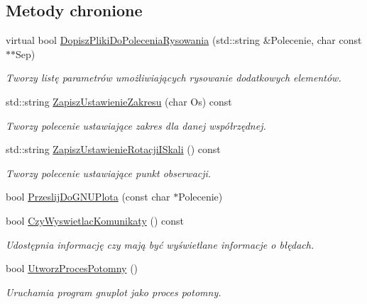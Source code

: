\subsection*{Metody chronione}
\begin{DoxyCompactItemize}
\item 
virtual bool \hyperlink{class_pz_g_1_1_lacze_do_g_n_u_plota_a25585ec3f1bd3b6bf42f374c38b8d237}{Dopisz\+Pliki\+Do\+Polecenia\+Rysowania} (std\+::string \&Polecenie, char const $\ast$$\ast$Sep)
\begin{DoxyCompactList}\small\item\em Tworzy listę parametrów umożliwiających rysowanie dodatkowych elementów. \end{DoxyCompactList}\item 
std\+::string \hyperlink{class_pz_g_1_1_lacze_do_g_n_u_plota_a4579aecf7b4777fdde0cae4e98c275c2}{Zapisz\+Ustawienie\+Zakresu} (char Os) const
\begin{DoxyCompactList}\small\item\em Tworzy polecenie ustawiające zakres dla danej współrzędnej. \end{DoxyCompactList}\item 
std\+::string \hyperlink{class_pz_g_1_1_lacze_do_g_n_u_plota_aa92b463e8cbae31b50dd797a4183bce8}{Zapisz\+Ustawienie\+Rotacji\+I\+Skali} () const
\begin{DoxyCompactList}\small\item\em Tworzy polecenie ustawiające punkt obserwacji. \end{DoxyCompactList}\item 
bool \hyperlink{class_pz_g_1_1_lacze_do_g_n_u_plota_a5063854b7232a7951d120a21df63f2b7}{Przeslij\+Do\+G\+N\+U\+Plota} (const char $\ast$Polecenie)
\item 
bool \hyperlink{class_pz_g_1_1_lacze_do_g_n_u_plota_a5e4f3a226ed36f7110032d802d84847c}{Czy\+Wyswietlac\+Komunikaty} () const
\begin{DoxyCompactList}\small\item\em Udostępnia informację czy mają być wyświetlane informacje o błędach. \end{DoxyCompactList}\item 
bool \hyperlink{class_pz_g_1_1_lacze_do_g_n_u_plota_a1c7b9acc40de8d8bbb40fb0722512933}{Utworz\+Proces\+Potomny} ()
\begin{DoxyCompactList}\small\item\em Uruchamia program {\itshape gnuplot} jako proces potomny. \end{DoxyCompactList}\item 
$$
\end{DoxyCompactItemize}
